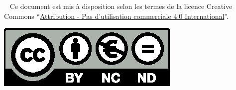 \mbox{~}
\vfill
Ce document est mis à disposition selon les termes de la licence Creative
Commons “\href{https://creativecommons.org/licenses/by-nc-nd/4.0/}{Attribution
- Pas d'utilisation commerciale 4.0 International}”.

\begin{center}
  \includegraphics[scale=1]
    {textures/images/license/license.eps}
\end{center}
\setcounter{page}{0}
\thispagestyle{empty}

